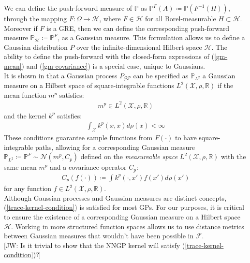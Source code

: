 \documentclass{article}
\newcommand{\jw}[1]{{\color{gray} [JW: #1]}}
\newcommand{\GP}{\operatorname{\mathcal{GP}}}
\numberwithin{equation}{section}
\begin{document}
We can define the push-forward measure of $\mathbb{P}$ as $\mathbb{P}^{F}(A) \coloneqq \mathbb{P}(F^{-1}(H))$, through the mapping $F: \Omega \rightarrow \mathcal{H}$, where $F \in \mathcal{H}$ for all Borel-measurable $H \subset \mathcal{H}$. Moreover if $F$ is a GRE, then we can define the corresponding push-forward measure $\mathbb{P}_{\mathcal{H}} \coloneqq \mathbb{P}^{F}$, as a Gaussian measure. This formulation allows us to define a Gaussian distribution $P$ over the infinite-dimensional Hilbert space $\mathcal{H}$. The ability to define the push-forward with the closed-form expressions of (\ref{gm-mean}) and (\ref{gm-covariance}) is a special case, unique to Gaussians.
\newline
\\It is shown in \cite{wild2022generalized} that a Gaussian process $P_{\GP}$ can be specified as $\mathbb{P}_{L^2}$ a Gaussian measure on a Hilbert space of square-integrable functions $L^2(\mathcal{X}, \rho, \mathbb{R})$ if the mean function $m^p$ satisfies:
\begin{align}
    \label{smooth-mean-function-condition}
    m^p \in L^2(\mathcal{X}, \rho, \mathbb{R})
\end{align}
and the kernel $k^p$ satisfies:
\begin{align}
    \int_{\mathcal{X}} k^p(x, x) d\rho(x) < \infty
    \label{trace-kernel-condition}
\end{align}
These conditions guarantee sample functions from $F(\cdot)$ to have square-integrable paths, allowing for a corresponding Gaussian measure $\mathbb{P}_{L^2} \coloneqq \mathbb{P}^F \sim \mathcal{N}(m^p, C_p)$ defined on the \textit{measureable space} $L^2(\mathcal{X}, \rho, \mathbb{R})$ with the same mean $m^p$ and a covariance operator $C_p$:
\begin{align}
    C_p(f(\cdot)) \coloneqq \int k^p(\cdot, x')f(x')d \rho(x')
    \label{gm-covariance-operator}
\end{align}
for any function $f \in L^2(\mathcal{X}, \rho, \mathbb{R})$. \\
\newline
Although Gaussian processes and Gaussian measures are distinct concepts, (\ref{trace-kernel-condition}) is satisfied for most GPs. For our purposes, it is critical to ensure the existence of a corresponding Gaussian measure on a Hilbert space $\mathcal{H}$. Working in more structured function spaces allows us to use distance metrics between Gaussian measures that wouldn't have been possible in $\mathcal{F}$.
\\\jw{Is it trivial to show that the NNGP kernel will satisfy (\ref{trace-kernel-condition})?}
\end{document}
